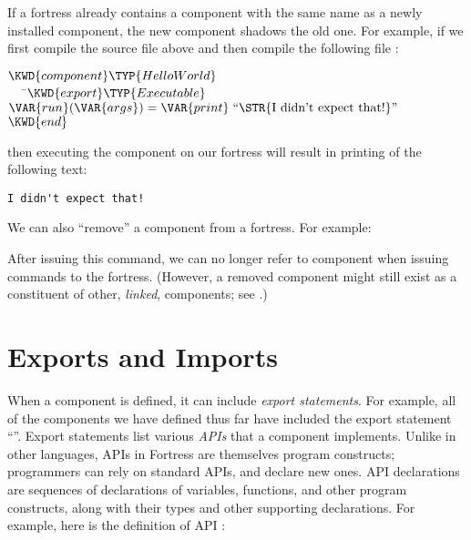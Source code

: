 If a fortress already contains a component with the same name as a
newly installed component, the new component shadows the old one. For
example, if we first compile the source file 
above and then compile the following file :

\begin{Fortress}
\(\KWD{component} \TYP{HelloWorld}\)\\
{\tt~~~}\pushtabs\=\+\(   \KWD{export} \TYP{Executable}\)\\
\(   \VAR{run}(\VAR{args}) = \VAR{print}\;\hbox{\rm``\STR{I~didn't~expect~that!}''}\)\-\\\poptabs
\(\KWD{end}\)
\end{Fortress}

then executing the component  on our fortress will result in
printing of the following text:

\begin{verbatim}
I didn't expect that!
\end{verbatim}

We can also ``remove'' a component from a fortress.
For example:


After issuing this command, we can no longer refer to 
component when issuing commands to the fortress.
(However, a removed component might still exist as a constituent of other,
\emph{linked}, components; see .)

\label{overviewComponent}
\section{Exports and Imports}

When a component is defined, it can include \emph{export statements}.
For example,
all of the components we have defined thus far
have included the export statement ``''.
Export statements list various \emph{APIs}
that a component implements.
Unlike in other languages, APIs in
Fortress are themselves program constructs; programmers can rely on
standard APIs, and declare new ones. API declarations are sequences of
declarations of
variables, functions, and other program constructs, along with their
types and other
supporting declarations. For example, here is the definition of API
:


